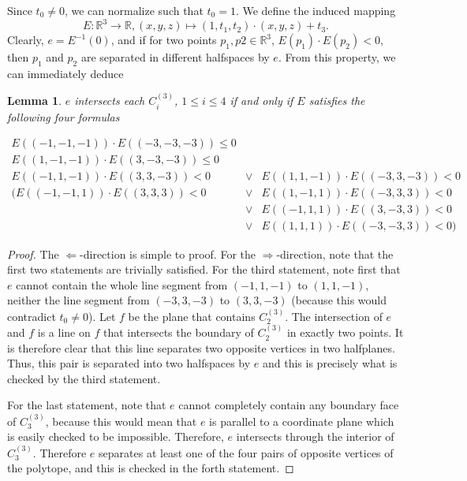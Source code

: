 \documentclass[12pt]{article}
\newcommand{\R}{\mathbb{R}}
\newtheorem{lemma}[theorem]{Lemma}
\begin{document}
\begin{appendix}
Since $t_0\neq 0$, we can normalize such that $t_0=1$. We define the induced mapping 
\[E:\R^3\rightarrow\R, (x,y,z)\mapsto (1,t_1,t_2)\cdot (x,y,z) + t_3.\]
Clearly, $e=E^{-1}(0)$, and
if for two points $p_1,p2\in\R^3$, $E(p_1)\cdot E(p_2)<0$, 
then $p_1$ and $p_2$ are separated in different halfspaces by $e$.
From this property, we can immediately deduce

\begin{lemma}\label{lem:formula_1}
$e$ intersects each $C_i^{(3)}$, $1\leq i\leq 4$ if and only if $E$ satisfies the following four formulas

\begin{eqnarray*}
E((-1,-1,-1))\cdot E((-3,-3,-3))\leq 0&&\\
E((1,-1,-1))\cdot E((3,-3,-3))\leq 0&&\\
E((-1,1,-1))\cdot E((3,3,-3))< 0&\vee& E((1,1,-1))\cdot E((-3,3,-3))< 0\\
(E((-1,-1,1))\cdot E((3,3,3))< 0 &\vee& E((1,-1,1))\cdot E((-3,3,3))< 0\\
&\vee&E((-1,1,1))\cdot E((3,-3,3))< 0\\
&\vee& E((1,1,1))\cdot E((-3,-3,3))< 0)
\end{eqnarray*}
\end{lemma}

\begin{proof}
The $\Leftarrow$-direction is simple to proof.
For the $\Rightarrow$-direction, note that the
first two statements are trivially satisfied. For the third statement, 
note first that $e$ cannot contain
the whole line segment from $(-1,1,-1)$ to $(1,1,-1)$, neither the line segment
from $(-3,3,-3)$ to $(3,3,-3)$ (because this would contradict $t_0\neq 0$).
Let $f$ be the plane
that contains $C_2^{(3)}$. The intersection of $e$ and $f$ is a line on $f$
that intersects the boundary of $C_2^{(3)}$ in exactly two points. It is therefore
clear that this line separates two opposite vertices in two halfplanes.
Thus, this pair is separated into two halfspaces by $e$ and this is precisely
what is checked by the third statement.

For the last statement, note that $e$ cannot completely contain
any boundary face of $C_3^{(3)}$, because this would mean that $e$ is
parallel to a coordinate plane which is easily checked to be impossible.
Therefore, $e$ intersects through the interior of $C_3^{(3)}$.
Therefore $e$ separates at least one of the four pairs of opposite vertices of the polytope,
and this is checked in the forth statement.
\end{proof}


\end{appendix}
\end{document}

